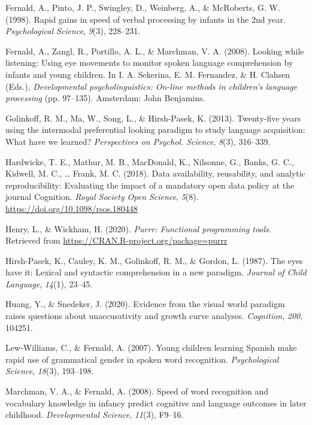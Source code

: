 \documentclass[
  english,
  man,floatsintext]{apa6}
\begin{document}
\leavevmode\hypertarget{ref-fernald1998}{}%
Fernald, A., Pinto, J. P., Swingley, D., Weinberg, A., \& McRoberts, G. W. (1998). Rapid gains in speed of verbal processing by infants in the 2nd year. \emph{Psychological Science}, \emph{9}(3), 228--231.

\leavevmode\hypertarget{ref-Fernald2008}{}%
Fernald, A., Zangl, R., Portillo, A. L., \& Marchman, V. A. (2008). Looking while listening: Using eye movements to monitor spoken language comprehension by infants and young children. In I. A. Sekerina, E. M. Fernandez, \& H. Clahsen (Eds.), \emph{Developmental psycholinguistics: On-line methods in children's language processing} (pp. 97--135). Amsterdam: John Benjamins.

\leavevmode\hypertarget{ref-Golinkoff2013}{}%
Golinkoff, R. M., Ma, W., Song, L., \& Hirsh-Pasek, K. (2013). Twenty-five years using the intermodal preferential looking paradigm to study language acquisition: What have we learned? \emph{Perspectives on Psychol. Science}, \emph{8}(3), 316--339.

\leavevmode\hypertarget{ref-Hardwicke2018}{}%
Hardwicke, T. E., Mathur, M. B., MacDonald, K., Nilsonne, G., Banks, G. C., Kidwell, M. C., \ldots{} Frank, M. C. (2018). Data availability, reusability, and analytic reproducibility: Evaluating the impact of a mandatory open data policy at the journal Cognition. \emph{Royal Society Open Science}, \emph{5}(8). \url{https://doi.org/10.1098/rsos.180448}

\leavevmode\hypertarget{ref-R-purrr}{}%
Henry, L., \& Wickham, H. (2020). \emph{Purrr: Functional programming tools}. Retrieved from \url{https://CRAN.R-project.org/package=purrr}

\leavevmode\hypertarget{ref-Hirsh-Pasek1987}{}%
Hirsh-Pasek, K., Cauley, K. M., Golinkoff, R. M., \& Gordon, L. (1987). The eyes have it: Lexical and syntactic comprehension in a new paradigm. \emph{Journal of Child Language}, \emph{14}(1), 23--45.

\leavevmode\hypertarget{ref-Huang2020}{}%
Huang, Y., \& Snedeker, J. (2020). Evidence from the visual world paradigm raises questions about unaccusativity and growth curve analyses. \emph{Cognition}, \emph{200}, 104251.

\leavevmode\hypertarget{ref-Lew-Williams2007}{}%
Lew-Williams, C., \& Fernald, A. (2007). Young children learning Spanish make rapid use of grammatical gender in spoken word recognition. \emph{Psychological Science}, \emph{18}(3), 193--198.

\leavevmode\hypertarget{ref-Marchman2008}{}%
Marchman, V. A., \& Fernald, A. (2008). Speed of word recognition and vocabulary knowledge in infancy predict cognitive and language outcomes in later childhood. \emph{Developmental Science}, \emph{11}(3), F9--16.
\end{document}
